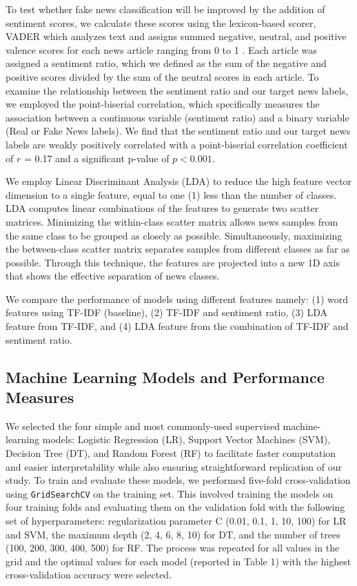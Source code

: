 \documentclass[10pt,a4paper,twoside]{article}
\begin{document}
To test whether fake news classification will be improved by the addition of sentiment scores, we calculate these scores using the lexicon-based scorer, VADER which analyzes text and assigns summed negative, neutral, and positive valence scores for each news article ranging from 0 to 1 \cite{VADER}. Each article was assigned a sentiment ratio, which we defined as the sum of the negative and positive scores divided by the sum of the neutral scores in each article. To examine the relationship between the sentiment ratio and our target news labels, we employed the point-biserial correlation, which specifically measures the association between a continuous variable (sentiment ratio) and a binary variable (Real or Fake News labels).  We find that the sentiment ratio and our target news labels are weakly positively correlated with a point-biserial correlation coefficient of $r$ = 0.17 and a significant p-value of $p < 0.001$.

We employ Linear Discriminant Analysis (LDA) to reduce the high feature vector dimension to a single feature, equal to one (1) less than the number of classes. LDA computes linear combinations of the features to generate two scatter matrices. Minimizing the within-class scatter matrix allows news samples from the same class to be grouped as closely as possible. Simultaneously, maximizing the between-class scatter matrix separates samples from different classes as far as possible. Through this technique, the features are projected into a new 1D axis that shows the effective separation of news classes.

We compare the performance of models using different features namely: (1) word features using TF-IDF (baseline), (2) TF-IDF and sentiment ratio, (3) LDA feature from TF-IDF, and (4) LDA feature from the combination of TF-IDF and sentiment ratio.
\vspace{-0.5em}
\subsection{Machine Learning Models and Performance Measures}
We selected the four simple and most commonly-used supervised machine-learning models: Logistic Regression (LR), Support Vector Machines (SVM), Decision Tree (DT), and Random Forest (RF) to facilitate faster computation and easier interpretability while also ensuring straightforward replication of our study. To train and evaluate these models, we performed five-fold cross-validation using {\color{gray}\texttt{GridSearchCV}} on the training set. This involved training the models on four training folds and evaluating them on the validation fold with the following set of hyperparameters: regularization parameter C (0.01, 0.1, 1, 10, 100) for LR and SVM, the maximum depth (2, 4, 6, 8, 10) for DT, and the number of trees (100, 200, 300, 400, 500) for RF. The process was repeated for all values in the grid and the optimal values for each model (reported in Table 1) with the highest cross-validation accuracy were selected.
\end{document}
